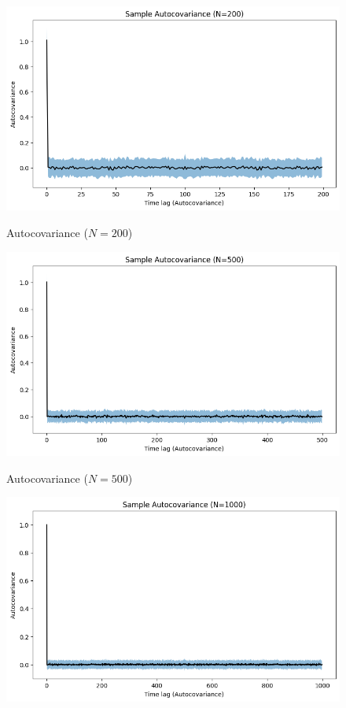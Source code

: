 \documentclass[11pt]{article}
\begin{document}
\begin{exercise}
\begin{figure}
    \centering
    \begin{minipage}[t]{0.3\textwidth}
    \centerline{\includegraphics[width=\textwidth]{figures/autocovariance_N200.png}}
    \centerline{Autocovariance ($N=200$)}
    \end{minipage}
    \begin{minipage}[t]{0.3\textwidth}
    \centerline{\includegraphics[width=\textwidth]{figures/autocovariance_N500.png}}
    \centerline{Autocovariance ($N=500$)}
    \end{minipage}
    \begin{minipage}[t]{0.3\textwidth}
    \centerline{\includegraphics[width=\textwidth]{figures/autocovariance_N1000.png}}

\end{minipage}
\end{figure}
\end{exercise}
\end{document}
